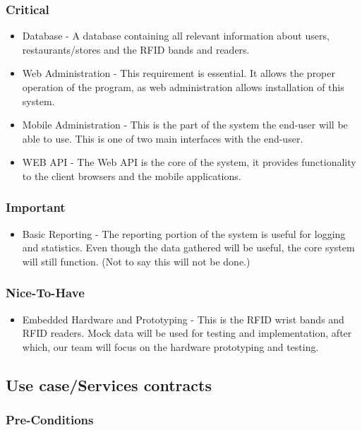 \documentclass[11pt,titlepage]{article} %
\begin{document}
	\subsubsection{Critical}
\begin{itemize}
\item Database - A database containing all relevant information about users, restaurants/stores and the RFID bands and readers.
\item Web Administration - This requirement is essential. It allows the proper operation of the program, as web administration allows installation of this system.
\item Mobile Administration - This is the part of the system the end-user will be able to use. This is one of two main interfaces with the end-user.
\item WEB API - The Web API is the core of the system, it provides functionality to the client browsers and the mobile applications.
\end{itemize}

	\subsubsection{Important}
\begin{itemize}
\item Basic Reporting - The reporting portion of the system is useful for logging and statistics. Even though the data gathered will be useful, the core system will still function. (Not to say this will not be done.)
\end{itemize}

	\subsubsection{Nice-To-Have}
\begin{itemize}
\item Embedded Hardware and Prototyping - This is the RFID wrist bands and RFID readers. Mock data will be used for testing and implementation, after which, our team will focus on the hardware prototyping and testing.
\end{itemize}


\subsection{Use case/Services contracts}

	\subsubsection{Pre-Conditions}
\end{document}
